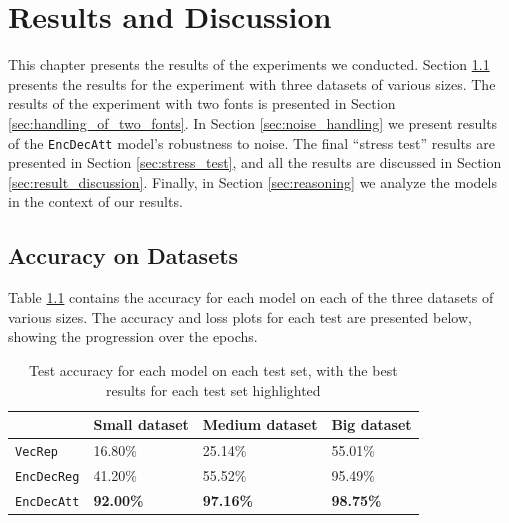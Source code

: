 
\chapter{Results and Discussion}
\label{ch:results}
This chapter presents the results of the experiments we conducted. Section \ref{sec:accuracy_on_datasets_results} presents the results for the experiment with three datasets of various sizes. The results of the experiment with two fonts is presented in Section \ref{sec:handling_of_two_fonts}. In Section \ref{sec:noise_handling} we present results of the {\tt EncDecAtt} model's robustness to noise. The final ``stress test'' results are presented in Section \ref{sec:stress_test}, and all the results are discussed in Section \ref{sec:result_discussion}. Finally, in Section \ref{sec:reasoning} we analyze the models in the context of our results.


\section{Accuracy on Datasets}
\label{sec:accuracy_on_datasets_results}
Table \ref{table:accuracy_model_data_sets} contains the accuracy for each model on each of the three datasets of various sizes. The accuracy and loss plots for each test are presented below, showing the progression over the epochs.

\begin{table}[h]
    \centering
    \begin{tabular}{|l|l|l|l|}
        \hline 
                                        & \textbf{Small dataset}          & \textbf{Medium dataset}         & \textbf{Big dataset}            \\ \hline
        {\tt VecRep }                   & 16.80\%                         & 25.14\%                         & 55.01\%                         \\ \hline
        {\tt EncDecReg}                 & 41.20\%                         & 55.52\%                         & 95.49\%                         \\ \hline
        {\tt EncDecAtt}                 & \textbf{92.00\%}                & \textbf{97.16\%}                & \textbf{98.75\%}                \\ \hline
    \end{tabular}
    \captionsetup{justification=centering}
    \caption{Test accuracy for each model on each test set, with the best results for each test set highlighted}
    \label{table:accuracy_model_data_sets}
\end{table}

